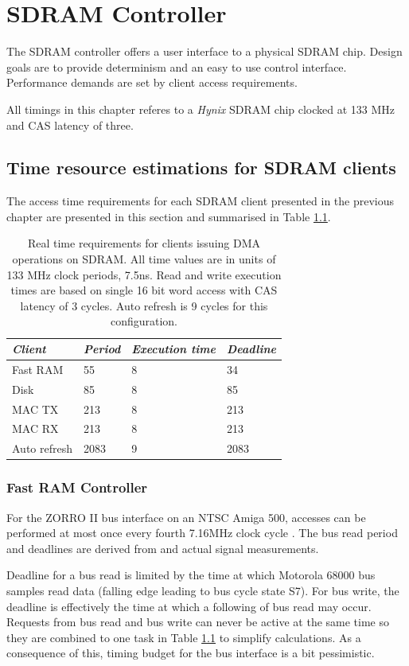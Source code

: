 \documentclass[a4paper]{report}
\begin{document}
\chapter{SDRAM Controller}
The SDRAM controller offers a user interface to a physical
SDRAM chip.  Design goals are to provide determinism and an
easy to use control interface.  Performance demands are set
by client access requirements.

All timings in this chapter referes to a \emph{Hynix} SDRAM
chip clocked at 133 MHz and CAS latency of three.

\section{Time resource estimations for SDRAM clients}
The access time requirements for each SDRAM client presented
in the previous chapter are presented in this section and
summarised in Table \ref{sdram_clients}.

\begin{table}
\begin{tabular}{*4l}    \toprule
\emph{Client} & \emph{Period} & \emph{Execution time} & \emph{Deadline} \\
\midrule
Fast RAM      & 55    & 8 & 34   \\
Disk          & 85    & 8 & 85   \\
MAC TX        & 213   & 8 & 213  \\
MAC RX        & 213   & 8 & 213  \\
Auto refresh  & 2083  & 9 & 2083 \\
\bottomrule
 \hline
\end{tabular}
\caption{Real time requirements for clients issuing DMA
operations on SDRAM.  All time values are in units of 133 MHz
clock periods, 7.5ns.  Read and write execution times are based on single 16
bit word access with CAS latency of 3 cycles. Auto refresh is 9 cycles
for this configuration.}
\label{sdram_clients}
\end{table}

\subsection{Fast RAM Controller}
For the ZORRO II bus interface on an NTSC Amiga 500,
accesses can be performed at most once every fourth 7.16MHz
clock cycle \cite{mc68000um}.  The bus read period and
deadlines are derived from \cite{mc68000um} and actual signal
measurements.

Deadline for a bus read is limited by the time at which Motorola
68000 bus samples read data (falling edge leading to bus cycle
state S7).  For bus write, the deadline is effectively the time
at which a following of bus read may occur.  Requests from
bus read and bus write can never be active at the same time
so they are combined to one task in Table \ref{sdram_clients}
to simplify calculations. As a consequence of this, timing
budget for the bus interface is a bit pessimistic.
\end{document}
